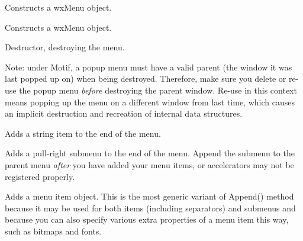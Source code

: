 Constructs a wxMenu object.





Constructs a wxMenu object.




\label{wxmenudtor}


Destructor, destroying the menu.

Note: under Motif, a popup menu must have a valid parent (the window
it was last popped up on) when being destroyed. Therefore, make sure
you delete or re-use the popup menu {\it before} destroying the
parent window. Re-use in this context means popping up the menu on
a different window from last time, which causes an implicit destruction
and recreation of internal data structures.


\label{wxmenuappend}


Adds a string item to the end of the menu.


Adds a pull-right submenu to the end of the menu. Append the submenu to the parent
menu {\it after} you have added your menu items, or accelerators may not be
registered properly.


Adds a menu item object. This is the most generic variant of Append() method
because it may be used for both items (including separators) and submenus and
because you can also specify various extra properties of a menu item this way,
such as bitmaps and fonts.

